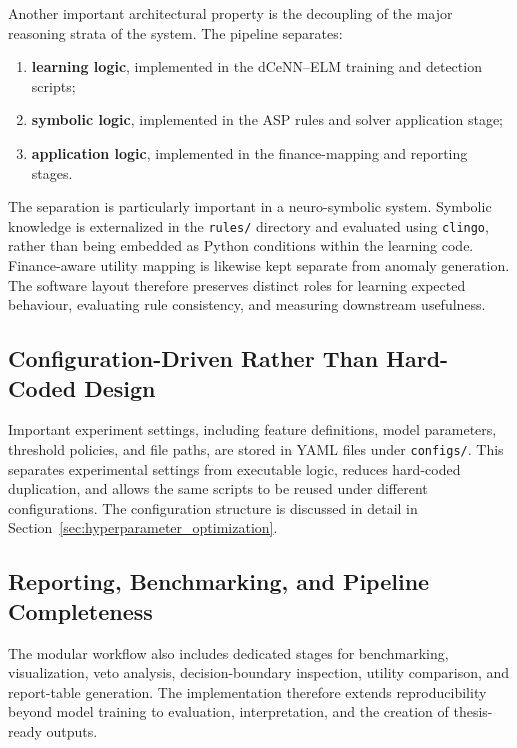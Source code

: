 Another important architectural property is the decoupling of the major reasoning strata of the system. The pipeline separates:
\begin{enumerate}
	\item \textbf{learning logic}, implemented in the dCeNN--ELM training and detection scripts;
	\item \textbf{symbolic logic}, implemented in the ASP rules and solver application stage;
	\item \textbf{application logic}, implemented in the finance-mapping and reporting stages.
\end{enumerate}

The separation is particularly important in a neuro-symbolic system. Symbolic knowledge is externalized in the \texttt{rules/} directory and evaluated using \texttt{clingo}, rather than being embedded as Python conditions within the learning code. Finance-aware utility mapping is likewise kept separate from anomaly generation. The software layout therefore preserves distinct roles for learning expected behaviour, evaluating rule consistency, and measuring downstream usefulness.

\subsection{Configuration-Driven Rather Than Hard-Coded Design}

Important experiment settings, including feature definitions, model parameters, threshold policies, and file paths, are stored in YAML files under \texttt{configs/}. This separates experimental settings from executable logic, reduces hard-coded duplication, and allows the same scripts to be reused under different configurations. The configuration structure is discussed in detail in Section~\ref{sec:hyperparameter_optimization}.

\subsection{Reporting, Benchmarking, and Pipeline Completeness}

The modular workflow also includes dedicated stages for benchmarking, visualization, veto analysis, decision-boundary inspection, utility comparison, and report-table generation. The implementation therefore extends reproducibility beyond model training to evaluation, interpretation, and the creation of thesis-ready outputs.

